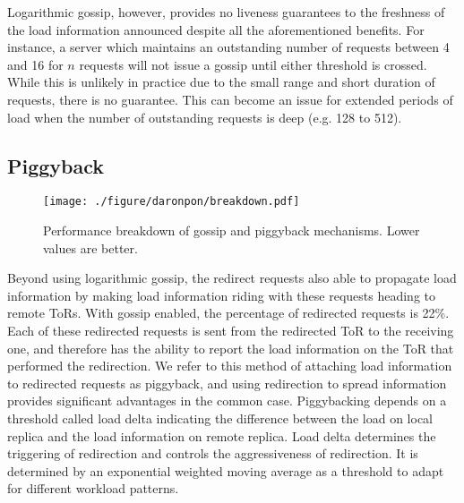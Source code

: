 Logarithmic gossip, however, provides no liveness
guarantees to the freshness of the load information announced despite all the aforementioned benefits. 
%
For instance, a server which maintains an outstanding number
of requests between 4 and 16 for $n$ requests will not issue a gossip
until either threshold is crossed. While this is unlikely in practice
due to the small range and short duration of requests, there is no
guarantee. This can become an issue for extended periods of load when
the number of outstanding requests is deep (e.g. 128 to 512).

\subsection{Piggyback}

\label{daronpon:sec:design:piggyback}
\begin{figure}[t]
  \centering
    \texttt{[image: ./figure/daronpon/breakdown.pdf]}
    \centering
    \caption{Performance breakdown of gossip and piggyback mechanisms.
    Lower values are better.} 
  \label{fig:breakdown}
\end{figure}

Beyond using logarithmic gossip, the redirect requests also able to propagate load information by making load information riding with these requests heading to remote ToRs.  
%
%
With gossip enabled, the percentage of redirected requests is 22\%. 
%
Each of these redirected requests is sent from the redirected ToR to the receiving one, and therefore has the ability to report the load information on the ToR that performed the redirection.  
%
We refer to this method of attaching load information to
redirected requests as piggyback, and using redirection to spread information
provides significant advantages in the common case.
%
Piggybacking depends on a threshold called load delta indicating the difference 
between the load on local replica and the load information on remote replica.
%
Load delta determines the triggering of redirection and controls the aggressiveness of redirection.
%
It is determined by an exponential weighted moving average as a threshold to adapt for different workload patterns.

